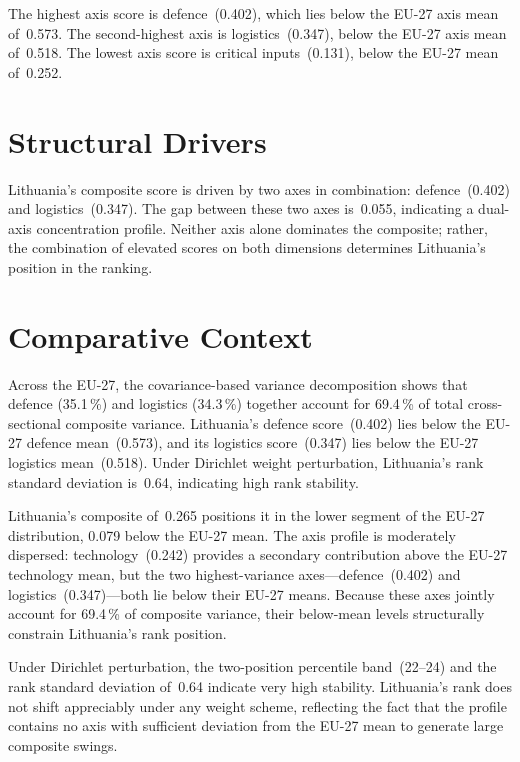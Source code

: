 \documentclass[12pt,a4paper]{article}
\begin{document}
The highest axis score is defence~(0.402), which lies below the EU-27 axis mean of~0.573.  The second-highest axis is logistics~(0.347), below the EU-27 axis mean of~0.518.  The lowest axis score is critical inputs~(0.131), below the EU-27 mean of~0.252.


\section{Structural Drivers}
\label{sec:drivers}

\begin{sloppypar}
Lithuania's composite score is driven by two axes in combination: defence~(0.402) and logistics~(0.347).  The gap between these two axes is~0.055, indicating a dual-axis concentration profile.  Neither axis alone dominates the composite; rather, the combination of elevated scores on both dimensions determines Lithuania's position in the ranking.
\end{sloppypar}


\section{Comparative Context}
\label{sec:comparative}

Across the EU-27, the covariance-based variance decomposition shows that defence (35.1\,\%) and logistics (34.3\,\%) together account for 69.4\,\% of total cross-sectional composite variance.  Lithuania's defence score~(0.402) lies below the EU-27 defence mean~(0.573), and its logistics score~(0.347) lies below the EU-27 logistics mean~(0.518).  Under Dirichlet weight perturbation, Lithuania's rank standard deviation is~0.64, indicating high rank stability.



Lithuania's composite of~0.265 positions it in the lower segment of the EU-27 distribution, 0.079 below the EU-27 mean.  The axis profile is moderately dispersed: technology~(0.242) provides a secondary contribution above the EU-27 technology mean, but the two highest-variance axes---defence~(0.402) and logistics~(0.347)---both lie below their EU-27 means.  Because these axes jointly account for 69.4\,\% of composite variance, their below-mean levels structurally constrain Lithuania's rank position.

Under Dirichlet perturbation, the two-position percentile band~(22--24) and the rank standard deviation of~0.64 indicate very high stability.  Lithuania's rank does not shift appreciably under any weight scheme, reflecting the fact that the profile contains no axis with sufficient deviation from the EU-27 mean to generate large composite swings.
\end{document}
